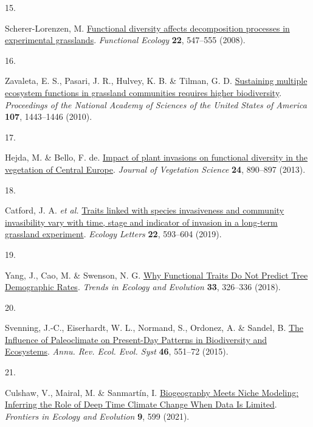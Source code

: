 \documentclass[
  10pt,
]{article}
\newlength{\cslhangindent}
\newlength{\csllabelwidth}
\newlength{\cslentryspacingunit} %
\newenvironment{CSLReferences}[2] %
 {%
  \setlength{\parindent}{0pt}
  \ifodd #1
  \let\oldpar\par
  \def\par{\hangindent=\cslhangindent\oldpar}
  \fi
  \setlength{\parskip}{#2\cslentryspacingunit}
 }%
 {}
\newcommand{\CSLLeftMargin}[1]{\parbox[t]{\csllabelwidth}{#1}}
\newcommand{\CSLRightInline}[1]{\parbox[t]{\linewidth - \csllabelwidth}{#1}\break}
\begin{document}
\begin{CSLReferences}{0}{0}
\leavevmode{}%
\CSLLeftMargin{15. }
\CSLRightInline{Scherer-Lorenzen, M. \href{https://doi.org/10.1111/J.1365-2435.2008.01389.X}{{Functional diversity affects decomposition processes in experimental grasslands}}. \emph{Functional Ecology} \textbf{22}, 547--555 (2008).}

\leavevmode{}%
\CSLLeftMargin{16. }
\CSLRightInline{Zavaleta, E. S., Pasari, J. R., Hulvey, K. B. \& Tilman, G. D. \href{https://doi.org/10.1073/PNAS.0906829107}{{Sustaining multiple ecosystem functions in grassland communities requires higher biodiversity}}. \emph{Proceedings of the National Academy of Sciences of the United States of America} \textbf{107}, 1443--1446 (2010).}

\leavevmode{}%
\CSLLeftMargin{17. }
\CSLRightInline{Hejda, M. \& Bello, F. de. \href{https://doi.org/10.1111/JVS.12026}{{Impact of plant invasions on functional diversity in the vegetation of Central Europe}}. \emph{Journal of Vegetation Science} \textbf{24}, 890--897 (2013).}

\leavevmode{}%
\CSLLeftMargin{18. }
\CSLRightInline{Catford, J. A. \emph{et al.} \href{https://doi.org/10.1111/ele.13220}{{Traits linked with species invasiveness and community invasibility vary with time, stage and indicator of invasion in a long-term grassland experiment}}. \emph{Ecology Letters} \textbf{22}, 593--604 (2019).}

\leavevmode{}%
\CSLLeftMargin{19. }
\CSLRightInline{Yang, J., Cao, M. \& Swenson, N. G. \href{https://doi.org/10.1016/j.tree.2018.03.003}{{Why Functional Traits Do Not Predict Tree Demographic Rates}}. \emph{Trends in Ecology and Evolution} \textbf{33}, 326--336 (2018).}

\leavevmode{}%
\CSLLeftMargin{20. }
\CSLRightInline{Svenning, J.-C., Eiserhardt, W. L., Normand, S., Ordonez, A. \& Sandel, B. \href{https://doi.org/10.1146/annurev-ecolsys-112414-054314}{{The Influence of Paleoclimate on Present-Day Patterns in Biodiversity and Ecosystems}}. \emph{Annu. Rev. Ecol. Evol. Syst} \textbf{46}, 551--72 (2015).}

\leavevmode{}%
\CSLLeftMargin{21. }
\CSLRightInline{Culshaw, V., Mairal, M. \& Sanmartín, I. \href{https://doi.org/10.3389/FEVO.2021.662092/BIBTEX}{{Biogeography Meets Niche Modeling: Inferring the Role of Deep Time Climate Change When Data Is Limited}}. \emph{Frontiers in Ecology and Evolution} \textbf{9}, 599 (2021).}


\end{CSLReferences}
\end{document}
